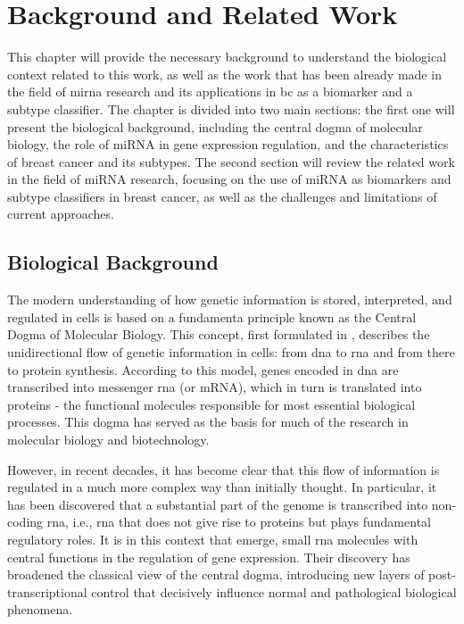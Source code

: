 
%

\chapter{Background and Related Work}
\label{chap:background}

This chapter will provide the necessary background to understand the biological
context related to this work, as well as the work that has been already made in
the field of \gls{mirna} research and its applications in \gls{bc} as a
biomarker and a subtype classifier. The chapter is divided into two main
sections: the first one will present the biological background, including the
central dogma of molecular biology, the role of miRNA in gene expression
regulation, and the characteristics of breast cancer and its subtypes. The second
section will review the related work in the field of miRNA research,
focusing on the use of miRNA as biomarkers and subtype classifiers in
breast cancer, as well as the challenges and limitations of current approaches.

\section{Biological Background}
The modern understanding of how genetic information is stored, interpreted, and
regulated in cells is based on a fundamenta principle known as the Central
Dogma of Molecular Biology. This concept, first formulated in
\textcites{discovery_dna_Watson1953The, updated_disc_of_dna_Pray2008DNA},
describes the unidirectional flow of genetic information in cells: from
\gls{dna} to \gls{rna} and from there to protein synthesis. According to this
model, genes encoded in \gls{dna} are transcribed into messenger \gls{rna} (or
mRNA), which in turn is translated into proteins - the functional molecules
responsible for most essential biological processes. This dogma has served as
the basis for much of the research in molecular biology and biotechnology.

However, in recent decades, it has become clear that this flow of information
is regulated in a much more complex way than initially thought. In particular,
it has been discovered that a substantial part of the genome is transcribed
into non-coding \gls{rna}, i.e., \gls{rna} that does not give rise to proteins
but plays fundamental regulatory roles. It is in this context that
 emerge, small \gls{rna} molecules with central functions in
the regulation of gene expression. Their discovery has broadened the classical
view of the central dogma, introducing new layers of post-transcriptional
control that decisively influence normal and pathological biological phenomena.

